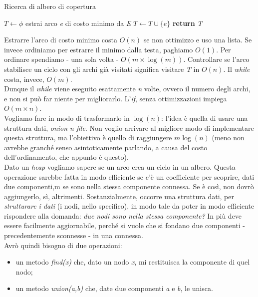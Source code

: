 \begin{algorithm}
	\caption{Ricerca di albero di copertura}\label{alg:AC}
	\begin{algorithmic}[1]
		\State $T \gets \phi$  
		\State estrai arco \textit{e} di costo minimo da \textit{E}
			\State $T \gets T \cup \{e\}$
		\EndIf
		\EndWhile
		\State \textbf{return} \textit{T}
		\EndFunction
	\end{algorithmic}
\end{algorithm}

Estrarre l'arco di costo minimo costa $O(n)$ se non ottimizzo e uso una lista. Se invece ordiniamo per estrarre il minimo dalla testa, paghiamo $O(1)$. Per ordinare spendiamo - una sola volta - $O(m\times \log(m))$. Controllare se l'arco stabilisce un ciclo con gli archi già visitati significa visitare \textit{T} in $O(n)$. Il \textit{while} costa, invece, $O(m)$. \\
Dunque il \textit{while} viene eseguito esattamente \textit{n} volte, ovvero il numero degli archi, e non si può far niente per migliorarlo. L'\textit{if}, senza ottimizzazioni impiega $O(m\times n)$. \\
Vogliamo fare in modo di trasformarlo in $\log(n)$: l'idea è quella di usare una struttura dati, \textit{onion n file}. Non voglio arrivare al migliore modo di implementare questa struttura, ma l'obiettivo è quello di raggiungere $m \log(n)$ (meno non avrebbe granché senso asintoticamente parlando, a causa del costo dell'ordinamento, che appunto è questo). \\
Dato un \textit{heap} vogliamo sapere se un arco crea un ciclo in un albero. Questa operazione sarebbe fatta in modo efficiente se c'è un coefficiente per scoprire, dati due componenti,m se sono nella stessa componente connessa. Se è così, non dovrò aggiungerlo, sì, altrimenti. Sostanzialmente, occorre una struttura dati, per \textit{strutturare i dati} (i nodi, nello specifico), in modo tale da poter in modo efficiente rispondere alla domanda: \textit{due nodi sono nella stessa componente?} In più deve essere facilmente aggiornabile, perché si vuole che si fondano due componenti - precedentemente sconnesse - in una connessa. \\
Avrò quindi bisogno di due operazioni:
\begin{itemize}
	\item un metodo \textit{find(x)} che, dato un nodo \textit{x}, mi restituisca la componente di quel nodo;
	\item un metodo \textit{union(a,b)} che, date due componenti \textit{a} e \textit{b}, le unisca.
\end{itemize}


